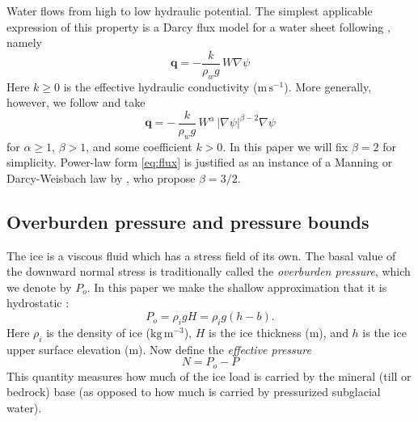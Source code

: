 \documentclass[11pt,final]{amsart}
\newcommand\bq{\mathbf{q}}
\newcommand{\grad}{\nabla}
\begin{document}
Water flows from high to low hydraulic potential.  The simplest applicable expression of this property is a Darcy flux model for a water sheet following \cite{Clarke05}, namely
\begin{equation}  \label{eq:fluxearly}
\bq = - \frac{k}{\rho_w g}\,W \grad \psi
\end{equation}
Here $k \ge 0$ is the effective hydraulic conductivity ($\text{m}\,\text{s}^{-1}$).  More generally, however, we follow \cite{Schoofetal2012} and take
\begin{equation}  \label{eq:flux}
\bq = - \, \frac{k}{\rho_w g}\, W^\alpha\, |\grad \psi|^{\beta-2} \grad \psi
\end{equation}
for $\alpha \ge 1$, $\beta>1$, and some coefficient $k>0$.  In this paper we will fix $\beta=2$ for simplicity.  Power-law form \eqref{eq:flux} is justified as an instance of a Manning or Darcy-Weisbach law by \cite{Schoofetal2012}, who propose $\beta=3/2$.

\subsection*{Overburden pressure and pressure bounds}  The ice is a viscous fluid which has a stress field of its own.  The basal value of the downward normal stress is traditionally called the \emph{overburden pressure}, which we denote by $P_o$.  In this paper we make the shallow approximation that it is hydrostatic \citep{GreveBlatter2009}:
\begin{equation} \label{eq:hydrostatic}
  P_o = \rho_i g H = \rho_i g (h-b).
\end{equation}
Here $\rho_i$ is the density of ice ($\text{kg}\,\text{m}^{-3}$), $H$ is the ice thickness (m), and $h$ is the ice upper surface elevation (m).  Now define the \emph{effective pressure}
\begin{equation}
N = P_o - P\label{eq:effective}
\end{equation}
This quantity measures how much of the ice load is carried by the mineral (till or bedrock) base (as opposed to how much is carried by pressurized subglacial water).
\end{document}
